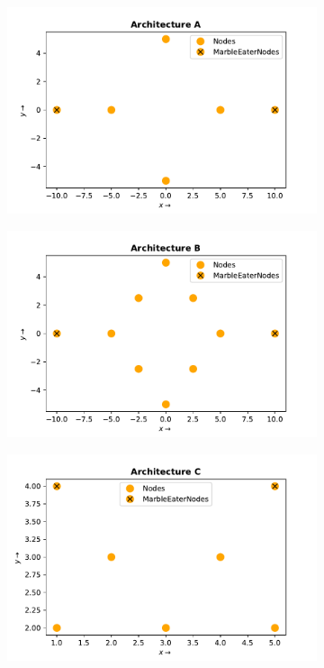 \begin{figure}
	\centering
	\begin{subfigure}[b]{0.3\textwidth}
		\centering
		\includegraphics[width=\textwidth]{figures/architecture_A.pdf}
		\label{fig:architecture_a}
	\end{subfigure}
	\begin{subfigure}[b]{0.3\textwidth}
		\centering
		\includegraphics[width=\textwidth]{figures/architecture_B.pdf}
		\label{fig:architecture_b}
	\end{subfigure}
	\begin{subfigure}[b]{0.3\textwidth}
		\centering
		\includegraphics[width=\textwidth]{figures/architecture_C.pdf}
		\label{fig:architecture_c}
	\end{subfigure}


\end{figure}
